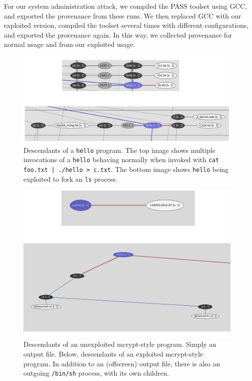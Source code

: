 \documentclass[10pt,twocolumn]{article}
\begin{document}
For our system administration attack, we compiled the PASS toolset using GCC, and exported the provenance from these runs. We then replaced GCC with our exploited version, compiled the toolset several times with different configurations, and exported the provenance again. In this way, we collected provenance for normal usage and from our exploited usage.
\begin{figure}
  \label{hello-orbiter}
  \caption{Descendants of a \texttt{hello} program. The top image shows multiple invocations of a \texttt{hello} behaving normally when invoked with \texttt{cat foo.txt | ./hello > c.txt}. The bottom image shows \texttt{hello} being exploited to fork an \texttt{ls} process.} 
  \centering
    \includegraphics[width=\textwidth]{img/hello.png}
\end{figure}
\begin{figure}
  \label{mcrypt-orbiter}
  \caption{Descendants of an unexploited mcrypt-style program. Simply an output file. Below, descendants of an exploited mcrypt-style program. In addition to an (offscreen) output file, there is also an outgoing \texttt{/bin/sh} process, with its own children.}
  \centering
    \includegraphics[width=\textwidth]{img/mcrypt.png}
\end{figure}
\end{document}
